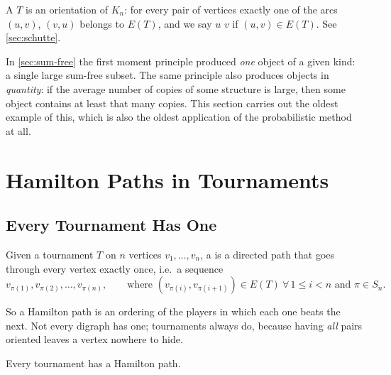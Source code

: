 
\begin{recall}
    A  \(T\) is an orientation of \(K_n\): for every pair of vertices exactly one of the arcs \((u,v)\), \((v,u)\) belongs to \(E(T)\), and we say \(u\)  \(v\) if \((u,v) \in E(T)\). See \autoref{sec:schutte}.
\end{recall}

In \autoref{sec:sum-free} the first moment principle produced \emph{one} object of a given kind: a single large sum-free subset. The same principle also produces objects in \emph{quantity}: if the average number of copies of some structure is large, then some object contains at least that many copies. This section carries out the oldest example of this, which is also the oldest application of the probabilistic method at all.

\section{Hamilton Paths in Tournaments}\label{sec:hamilton-tournaments}

\subsection{Every Tournament Has One}

\begin{definition}\label{def:hamilton-path}
    Given a tournament \(T\) on \(n\) vertices \(v_1, \ldots, v_n\), a  is a directed path that goes through every vertex exactly once, i.e.\ a sequence
    \[
        v_{\pi(1)}, v_{\pi(2)}, \ldots, v_{\pi(n)}, \qquad \text{where } (v_{\pi(i)}, v_{\pi(i+1)}) \in E(T) \ \forall\, 1 \le i < n \text{ and } \pi \in S_n.
    \]
\end{definition}

So a Hamilton path is an ordering of the players in which each one beats the next. Not every digraph has one; tournaments always do, because having \emph{all} pairs oriented leaves a vertex nowhere to hide.

\begin{claim}\label{clm:hamilton-exists}
    Every tournament has a Hamilton path.
\end{claim}


